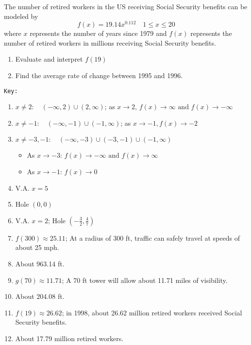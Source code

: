 \documentclass{article}
\newcounter{pset}
\begin{document}
The number of retired workers in the US receiving Social Security benefits can be modeled by 
\[
f(x) = 19.14x^{0.112} \quad 1 \leq x \leq 20
\]
where $x$ represents the number of years since 1979 and $f(x)$ represents the number of retired workers in millions receiving Social Security benefits.
\begin{enumerate}   \setcounter{enumi}{\value{pset}}
    \item Evaluate and interpret $f(19)$
    \item Find the average rate of change between 1995 and 1996.
\end{enumerate} \setcounter{pset}{\value{enumi}}





\newpage 

\texttt{Key:}

\begin{enumerate}
    \item $x \neq 2: \quad (-\infty, 2) \cup (2, \infty)$; as $x \to 2$, $f(x) \to \infty \text{ and } f(x) \to -\infty$
    \item $x \neq -1: \quad (-\infty, -1) \cup (-1, \infty)$; as $x \to -1, f(x) \to -2$
    \item $x \neq -3, -1: \quad (-\infty, -3) \cup (-3,-1) \cup (-1, \infty)$
    \begin{itemize}
        \item As $x \to -3$: $f(x) \to -\infty \text{ and } f(x) \to \infty$
        \item As $x \to -1$: $f(x) \to 0$
    \end{itemize}
    \item V.A. $x = 5$
    \item Hole $(0,0)$
    \item V.A. $x = 2$; Hole $\left(-\tfrac{3}{2},\tfrac{4}{7}\right)$
    \item $f(300) \approx 25.11$; At a radius of 300 ft, traffic can safely travel at speeds of about 25 mph.
    \item About 963.14 ft.
    \item $g(70) \approx 11.71$; A 70 ft tower will allow about 11.71 miles of visibility.
    \item About 204.08 ft.
    \item $f(19) \approx 26.62$; in 1998, about 26.62 million retired workers received Social Security benefits.
    \item About 17.79 million retired workers.
\end{enumerate}
\end{document}
